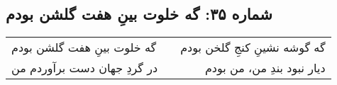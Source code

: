\begin{center}
\section*{شماره ۳۵: گه خلوت بینِ هفت گلشن بودم}
\label{sec:035}
\begin{longtable}{l p{0.5cm} r}
گه خلوت بینِ هفت گلشن بودم
&&
گه گوشه نشینِ کنجِ گلخن بودم
\\
در گردِ جهان دست برآوردم من
&&
دیار نبود بندِ من، من بودم
\\
\end{longtable}
\end{center}
